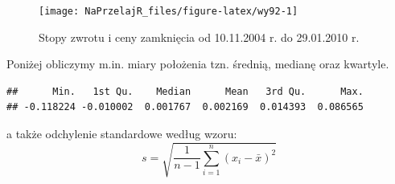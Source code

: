 \documentclass[polish,]{book}
\newenvironment{Shaded}{\begin{snugshade}}{\end{snugshade}}
\newcommand{\DataTypeTok}[1]{\textcolor[rgb]{0.13,0.29,0.53}{#1}}
\newcommand{\DecValTok}[1]{\textcolor[rgb]{0.00,0.00,0.81}{#1}}
\newcommand{\FloatTok}[1]{\textcolor[rgb]{0.00,0.00,0.81}{#1}}
\newcommand{\KeywordTok}[1]{\textcolor[rgb]{0.13,0.29,0.53}{\textbf{#1}}}
\newcommand{\NormalTok}[1]{#1}
\newcommand{\OperatorTok}[1]{\textcolor[rgb]{0.81,0.36,0.00}{\textbf{#1}}}
\newcommand{\StringTok}[1]{\textcolor[rgb]{0.31,0.60,0.02}{#1}}
\begin{document}
\begin{Shaded}
\end{Shaded}

\begin{figure}[h]

{\centering \texttt{[image: NaPrzelajR\_files/figure-latex/wy92-1]} 

}

\caption{Stopy zwrotu i ceny zamknięcia od 10.11.2004 r. do 29.01.2010 r.}\label{fig:wy92}
\end{figure}

Poniżej obliczymy m.in. miary położenia tzn. średnią, medianę oraz kwartyle.

\begin{Shaded}
\end{Shaded}

\begin{verbatim}
##      Min.   1st Qu.    Median      Mean   3rd Qu.      Max. 
## -0.118224 -0.010002  0.001767  0.002169  0.014393  0.086565
\end{verbatim}

a także odchylenie standardowe według wzoru:
\begin{equation}
s=\sqrt{\frac{1}{n-1}\sum_{i=1}^{n}(x_i-\bar{x})^2}
\label{eq:wz92}
\end{equation}
\end{document}
